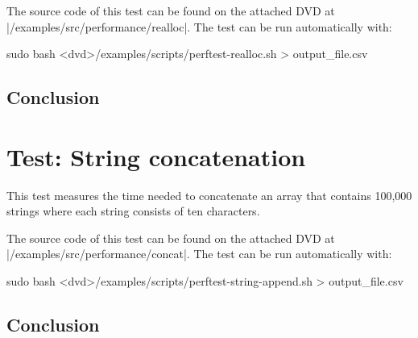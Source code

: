 \funclistend
The source code of this test can be found on the attached DVD at
|/examples/src/performance/realloc|. The test can be run automatically with:
\begin{commandline}
sudo bash <dvd>/examples/scripts/perftest-realloc.sh > output_file.csv
\end{commandline}

\subsection{Conclusion}

\section{Test: String concatenation}

This test measures the time needed to concatenate an array that contains
100,000 strings where each string consists of ten characters.

\funclistend
The source code of this test can be found on the attached DVD at
|/examples/src/performance/concat|. The test can be run automatically
with:
\begin{commandline}
sudo bash <dvd>/examples/scripts/perftest-string-append.sh > output_file.csv
\end{commandline}

\subsection{Conclusion}
